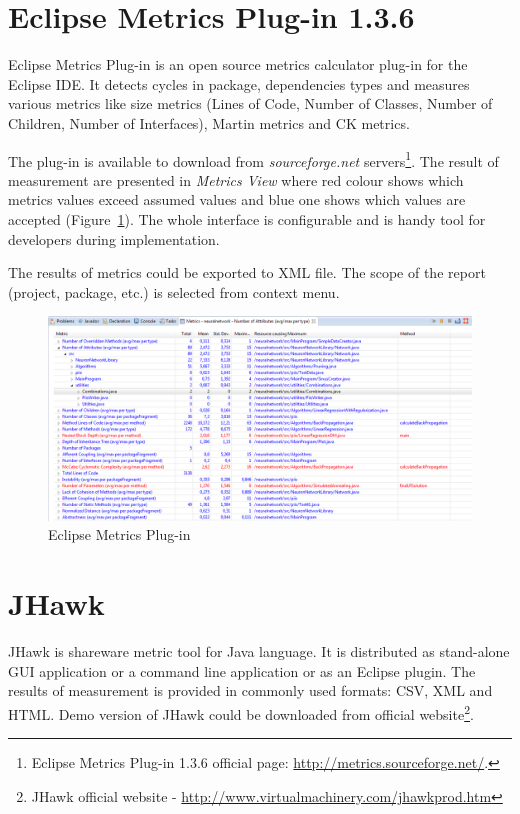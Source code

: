 \section{Eclipse Metrics Plug-in 1.3.6}
Eclipse Metrics Plug-in is an open source metrics calculator plug-in for the Eclipse IDE. It detects
cycles in package, dependencies types and measures various metrics like size metrics (Lines of Code, Number of Classes, Number of Children, Number of Interfaces), Martin metrics and \ac{CK metrics}. 

The plug-in is available to download from \textit{sourceforge.net} servers\footnote{Eclipse Metrics Plug-in 1.3.6 official page: \url{http://metrics.sourceforge.net/}.}. The result of measurement are presented in \textit{Metrics View} where red colour shows which metrics values exceed assumed values and blue one shows which values are accepted (Figure~\ref{fig:eclipsemetrics}). The whole interface is configurable and is handy tool for developers during implementation. 

The results of metrics could be exported to XML file. The scope of the report (project, package, etc.) is selected from context menu.

\begin{figure}[h!]
	\centering
	\includegraphics[scale=0.45]{img/eclipse-plugin.png} 
	\caption{Eclipse Metrics Plug-in}		
	\label{fig:eclipsemetrics}
\end{figure}


\section{JHawk}
JHawk is shareware metric tool for Java language. It is distributed as stand-alone GUI application or a command line application or as an Eclipse plugin. The results of measurement is provided in commonly used formats: CSV, XML and HTML. Demo version of JHawk could be downloaded from official website\footnote{JHawk official website - \url{http://www.virtualmachinery.com/jhawkprod.htm}}.

